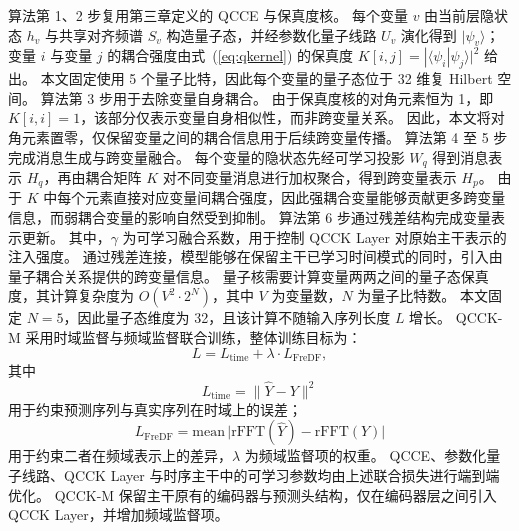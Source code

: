 算法第 1、2 步复用第三章定义的 QCCE 与保真度核。
每个变量 $v$ 由当前层隐状态 $h_v$ 与共享对齐频谱 $S_v$ 构造量子态，并经参数化量子线路 $U_v$ 演化得到 $|\psi_v\rangle$；变量 $i$ 与变量 $j$ 的耦合强度由式~(\ref{eq:qkernel}) 的保真度 $K[i,j] = |\langle\psi_i|\psi_j\rangle|^2$ 给出。
本文固定使用 5 个量子比特，因此每个变量的量子态位于 32 维复 Hilbert 空间。
算法第 3 步用于去除变量自身耦合。
由于保真度核的对角元素恒为 1，即 $K[i,i]=1$，该部分仅表示变量自身相似性，而非跨变量关系。
因此，本文将对角元素置零，仅保留变量之间的耦合信息用于后续跨变量传播。
算法第 4 至 5 步完成消息生成与跨变量融合。
每个变量的隐状态先经可学习投影 $W_q$ 得到消息表示 $H_q$，再由耦合矩阵 $K$ 对不同变量消息进行加权聚合，得到跨变量表示 $H_p$。
由于 $K$ 中每个元素直接对应变量间耦合强度，因此强耦合变量能够贡献更多跨变量信息，而弱耦合变量的影响自然受到抑制。
算法第 6 步通过残差结构完成变量表示更新。
其中，$\gamma$ 为可学习融合系数，用于控制 QCCK Layer 对原始主干表示的注入强度。
通过残差连接，模型能够在保留主干已学习时间模式的同时，引入由量子耦合关系提供的跨变量信息。
量子核需要计算变量两两之间的量子态保真度，其计算复杂度为 $O(V^2\cdot 2^N)$，其中 $V$ 为变量数，$N$ 为量子比特数。
本文固定 $N=5$，因此量子态维度为 32，且该计算不随输入序列长度 $L$ 增长。
QCCK-M 采用时域监督与频域监督联合训练，整体训练目标为：
\begin{equation}
\label{eq:loss-zh}
L = L_{\mathrm{time}} + \lambda \cdot L_{\mathrm{FreDF}},
\end{equation}
其中
\begin{equation}
L_{\mathrm{time}} = \lVert \hat{Y} - Y \rVert^2
\end{equation}
用于约束预测序列与真实序列在时域上的误差；
\begin{equation}
L_{\mathrm{FreDF}} = \mathrm{mean}\,\lvert \mathrm{rFFT}(\hat{Y}) - \mathrm{rFFT}(Y) \rvert
\end{equation}
用于约束二者在频域表示上的差异，$\lambda$ 为频域监督项的权重。
QCCE、参数化量子线路、QCCK Layer 与时序主干中的可学习参数均由上述联合损失进行端到端优化。
QCCK-M 保留主干原有的编码器与预测头结构，仅在编码器层之间引入 QCCK Layer，并增加频域监督项。


